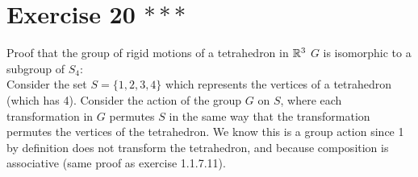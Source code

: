 \documentclass{article}
\begin{document}
    \section*{Exercise 20 $***$}
    Proof that the group of rigid motions of a tetrahedron in $\mathbb{R}^3$ $G$
    is isomorphic to a subgroup of $S_4$: \\
    Consider the set $S = \{1, 2, 3 ,4\}$ which represents the vertices of
    a tetrahedron (which has 4).
    Consider the action of the group $G$ on $S$,
    where each transformation in $G$ permutes $S$ in the same way that
    the transformation permutes the vertices of the tetrahedron.
    We know this is a group action since 1 by definition does not transform 
    the tetrahedron,
    and because composition is associative
    (same proof as exercise 1.1.7.11). \\
\end{document}

